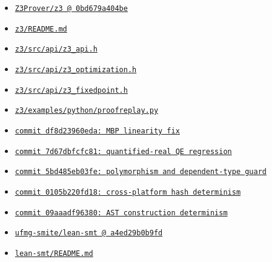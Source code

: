 \documentclass[11pt,letterpaper,openany]{report}
\newcommand{\sourcelink}[2]{\href{#1}{\nolinkurl{#2}}}
\begin{document}
\begin{itemize}
  \item \sourcelink{https://github.com/Z3Prover/z3/tree/0bd679a404bee551393fd94ca813ccc7eb034973}{Z3Prover/z3 @ 0bd679a404be}
  \item \sourcelink{https://github.com/Z3Prover/z3/blob/0bd679a404bee551393fd94ca813ccc7eb034973/README.md}{z3/README.md}
  \item \sourcelink{https://github.com/Z3Prover/z3/blob/0bd679a404bee551393fd94ca813ccc7eb034973/src/api/z3_api.h}{z3/src/api/z3_api.h}
  \item \sourcelink{https://github.com/Z3Prover/z3/blob/0bd679a404bee551393fd94ca813ccc7eb034973/src/api/z3_optimization.h}{z3/src/api/z3_optimization.h}
  \item \sourcelink{https://github.com/Z3Prover/z3/blob/0bd679a404bee551393fd94ca813ccc7eb034973/src/api/z3_fixedpoint.h}{z3/src/api/z3_fixedpoint.h}
  \item \sourcelink{https://github.com/Z3Prover/z3/blob/0bd679a404bee551393fd94ca813ccc7eb034973/examples/python/proofreplay.py}{z3/examples/python/proofreplay.py}
  \item \sourcelink{https://github.com/Z3Prover/z3/commit/df8d23960eda51b796bc82cfcbc3319f135a1b34}{commit df8d23960eda: MBP linearity fix}
  \item \sourcelink{https://github.com/Z3Prover/z3/commit/7d67dbfcfc81143bf35084e78543b658268afe37}{commit 7d67dbfcfc81: quantified-real QE regression}
  \item \sourcelink{https://github.com/Z3Prover/z3/commit/5bd485eb03fecc4366e6384dae9b19c4f35b681a}{commit 5bd485eb03fe: polymorphism and dependent-type guard}
  \item \sourcelink{https://github.com/Z3Prover/z3/commit/0105b220fd18c3ea00e8b165ca6be64ec2d2682a}{commit 0105b220fd18: cross-platform hash determinism}
  \item \sourcelink{https://github.com/Z3Prover/z3/commit/09aaadf9638073d09daf830aa877f2cea2787936}{commit 09aaadf96380: AST construction determinism}
  \item \sourcelink{https://github.com/ufmg-smite/lean-smt/tree/a4ed29b0b9fd840eefefa33146eb8fa3e14d35da}{ufmg-smite/lean-smt @ a4ed29b0b9fd}
  \item \sourcelink{https://github.com/ufmg-smite/lean-smt/blob/a4ed29b0b9fd840eefefa33146eb8fa3e14d35da/README.md}{lean-smt/README.md}
\end{itemize}
\end{document}
